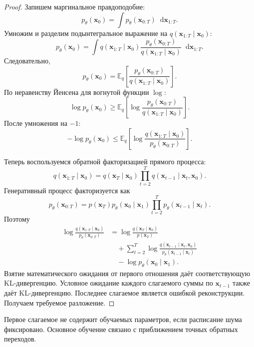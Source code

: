 \documentclass[12pt,a4paper]{article}
\theoremstyle{definition}
\newcommand{\E}{\mathbb{E}}
\newcommand{\dd}{\mathop{}\!\mathrm{d}}
\newcommand{\1}{\mathbf{1}}
\begin{document}
\begin{proof}
Запишем маргинальное правдоподобие:
\[
    p_\theta(\bm{x}_0)
    =
    \int
    p_\theta(\bm{x}_{0:T})
    \dd\bm{x}_{1:T}.
\]
Умножим и разделим подынтегральное выражение на
$q(\bm{x}_{1:T}\mid\bm{x}_0)$:
\[
    p_\theta(\bm{x}_0)
    =
    \int
    q(\bm{x}_{1:T}\mid\bm{x}_0)
    \frac{
        p_\theta(\bm{x}_{0:T})
    }{
        q(\bm{x}_{1:T}\mid\bm{x}_0)
    }
    \dd\bm{x}_{1:T}.
\]
Следовательно,
\[
    p_\theta(\bm{x}_0)
    =
    \E_q
    \left[
        \frac{
            p_\theta(\bm{x}_{0:T})
        }{
            q(\bm{x}_{1:T}\mid\bm{x}_0)
        }
    \right].
\]
По неравенству Йенсена для вогнутой функции $\log$:
\[
    \log p_\theta(\bm{x}_0)
    \geq
    \E_q
    \left[
        \log
        \frac{
            p_\theta(\bm{x}_{0:T})
        }{
            q(\bm{x}_{1:T}\mid\bm{x}_0)
        }
    \right].
\]
После умножения на $-1$:
\[
    -\log p_\theta(\bm{x}_0)
    \leq
    \E_q
    \left[
        \log
        \frac{
            q(\bm{x}_{1:T}\mid\bm{x}_0)
        }{
            p_\theta(\bm{x}_{0:T})
        }
    \right].
\]

Теперь воспользуемся обратной факторизацией прямого процесса:
\[
    q(\bm{x}_{1:T}\mid\bm{x}_0)
    =
    q(\bm{x}_T\mid\bm{x}_0)
    \prod_{t=2}^{T}
    q(\bm{x}_{t-1}\mid\bm{x}_t,\bm{x}_0).
\]
Генеративный процесс факторизуется как
\[
    p_\theta(\bm{x}_{0:T})
    =
    p(\bm{x}_T)
    p_\theta(\bm{x}_0\mid\bm{x}_1)
    \prod_{t=2}^{T}
    p_\theta(\bm{x}_{t-1}\mid\bm{x}_t).
\]
Поэтому
\begin{align*}
    \log
    \frac{
        q(\bm{x}_{1:T}\mid\bm{x}_0)
    }{
        p_\theta(\bm{x}_{0:T})
    }
    &=
    \log
    \frac{
        q(\bm{x}_T\mid\bm{x}_0)
    }{
        p(\bm{x}_T)
    }\\
    &\quad+
    \sum_{t=2}^{T}
    \log
    \frac{
        q(\bm{x}_{t-1}\mid\bm{x}_t,\bm{x}_0)
    }{
        p_\theta(\bm{x}_{t-1}\mid\bm{x}_t)
    }\\
    &\quad-
    \log p_\theta(\bm{x}_0\mid\bm{x}_1).
\end{align*}
Взятие математического ожидания от первого отношения даёт
соответствующую KL-дивергенцию. Условное ожидание каждого слагаемого
суммы по $\bm{x}_{t-1}$ также даёт KL-дивергенцию. Последнее
слагаемое является ошибкой реконструкции. Получаем требуемое
разложение.
\end{proof}

Первое слагаемое не содержит обучаемых параметров, если расписание
шума фиксировано. Основное обучение связано с приближением точных
обратных переходов.
\end{document}
